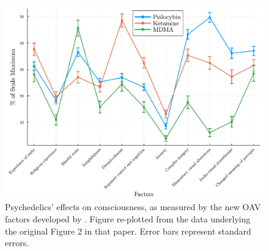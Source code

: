 \documentclass[12pt,letterpaper]{book}
\begin{document}
\FloatBarrier
\begin{figure}[htbp]
  \centering
  \includegraphics[width=\textwidth]{oavvalidationfigure2data/psychedelic_effects_plot.pdf}
  \caption{Psychedelics' effects on consciousness, as measured by the new OAV factors developed by \textcite{studerus2010psychometric}. Figure re-plotted from the data underlying the original Figure 2 in that paper. Error bars represent standard errors.}
  \label{consciousEffects}
\end{figure}
\FloatBarrier
\end{document}
